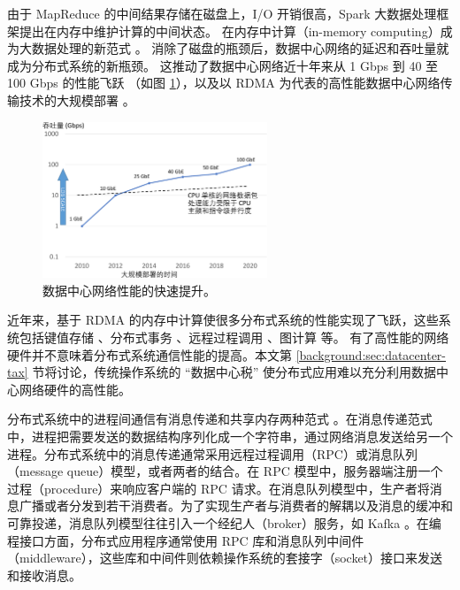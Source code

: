 由于 MapReduce 的中间结果存储在磁盘上，I/O 开销很高，Spark \cite{zaharia2010spark} 大数据处理框架提出在内存中维护计算的中间状态。
在内存中计算（in-memory computing）成为大数据处理的新范式 \cite{ousterhout2010case,dragojevic2014farm}。
消除了磁盘的瓶颈后，数据中心网络的延迟和吞吐量就成为分布式系统的新瓶颈。
这推动了数据中心网络近十年来从 1 Gbps 到 40 至 100 Gbps 的性能飞跃 \cite{al2008scalable}（如图 \ref{background:fig:network-perf-trend}），以及以 RDMA 为代表的高性能数据中心网络传输技术的大规模部署 \cite{guo2016rdma}。

\begin{figure}[htbp]
	\centering
	\includegraphics[width=0.6\textwidth]{figures/network_perf_trend.pdf}
	\caption{数据中心网络性能的快速提升。}
	\label{background:fig:network-perf-trend}
\end{figure}

近年来，基于 RDMA 的内存中计算使很多分布式系统的性能实现了飞跃，这些系统包括键值存储 \cite{dragojevic2014farm}、分布式事务 \cite{wei2015fast,chen2016fast,wei2018deconstructing}、远程过程调用 \cite{kalia2016fasst}、图计算 \cite{wang2018fast} 等。
有了高性能的网络硬件并不意味着分布式系统通信性能的提高。本文第 \ref{background:sec:datacenter-tax} 节将讨论，传统操作系统的 ``数据中心税'' 使分布式应用难以充分利用数据中心网络硬件的高性能。


分布式系统中的进程间通信有消息传递和共享内存两种范式 \cite{kshemkalyani2011distributed}。在消息传递范式中，进程把需要发送的数据结构序列化成一个字符串，通过网络消息发送给另一个进程。分布式系统中的消息传递通常采用远程过程调用（RPC）或消息队列（message queue）模型，或者两者的结合。在 RPC 模型中，服务器端注册一个过程（procedure）来响应客户端的 RPC 请求。在消息队列模型中，生产者将消息广播或者分发到若干消费者。为了实现生产者与消费者的解耦以及消息的缓冲和可靠投递，消息队列模型往往引入一个经纪人（broker）服务，如 Kafka \cite{kreps2011kafka}。在编程接口方面，分布式应用程序通常使用 RPC 库和消息队列中间件（middleware），这些库和中间件则依赖操作系统的套接字（socket）接口来发送和接收消息。


